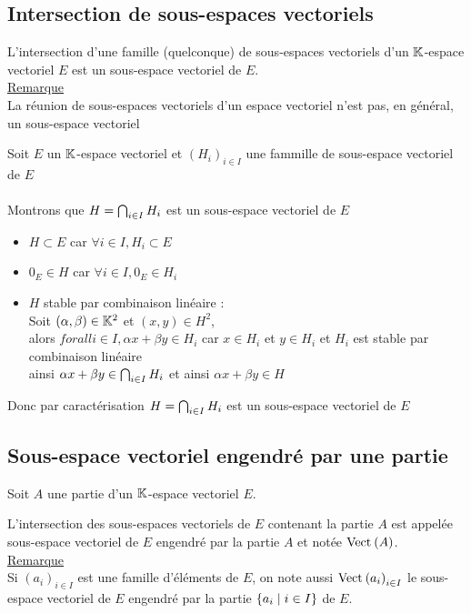 \subsection{Intersection de sous-espaces vectoriels}
\begin{defprop}
    L’intersection d’une famille (quelconque) de sous-espaces vectoriels d’un \(\mathbb{K}\)-espace vectoriel \(E\) est un sous-espace vectoriel de \(E\).\\
    \underline{Remarque}\\
    La réunion de sous-espaces vectoriels d’un espace vectoriel n’est pas, en général, un sous-espace vectoriel
\end{defprop}
\begin{dem}
    Soit \(E\) un \(\mathbb{K}\)-espace vectoriel et \((H_i)_{i  \in I}\) une fammille de sous-espace vectoriel de \(E\)\\~\\
    Montrons que \(H = \bigcap_{i \in I}H_i\) est un sous-espace vectoriel de \(E\)\\
    \begin{itemize}
        \item \(H \subset E\) car \(\forall i \in I , H_i \subset E\)
        \item \(0_E \in H\) car \(\forall i \in I , 0_E \in H_i \)
        \item \(H\) stable par combinaison linéaire : \\
        Soit \((\alpha,\beta) \in \mathbb{K}^2\) et \((x,y) \in H^2\), \\
        alors \(forall i \in I ,\alpha x + \beta y \in H_i\) car  \(x \in H_i \) et \( y \in H_i\) et \(H_i\) est stable par combinaison linéaire \\
        ainsi \(\alpha x + \beta y \in \bigcap_{i \in I} H_i\) et ainsi \(\alpha x + \beta y \in H\)
    \end{itemize}
    Donc par caractérisation \(H = \bigcap_{i \in I} H_i\) est un sous-espace vectoriel de \(E\)
\end{dem}

\subsection{Sous-espace vectoriel engendré par une partie}
Soit \(A\) une partie d’un \(\mathbb{K}\)-espace vectoriel \(E\).
\begin{defi}
    L’intersection des sous-espaces vectoriels de \(E\) contenant la partie \(A\) est appelée sous-espace vectoriel de \(E\) engendré par la partie \(A\) et notée \(\Vect{A}\).\\
    \underline{Remarque}\\
    Si \((a_i) _{i\in I}\) est une famille d’éléments de \(E\), on note aussi \(\Vect{a_i}_{ i\in I} \) le sous-espace vectoriel de \(E\) engendré par la partie \(\left\lbrace a_i \;\middle|\; i \in  I\right\rbrace\) de \(E\).
\end{defi}

